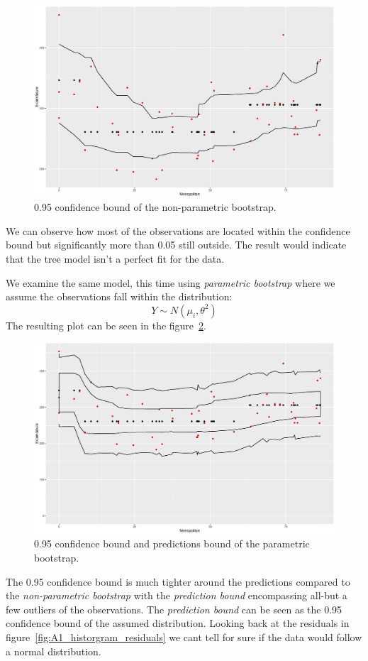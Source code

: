 \documentclass[a4paper,12pt]{article}
\begin{document}
    \begin{figure}[H]
    \centering
    \includegraphics[width=\textwidth]{figures/A1_nonparametric}  
    \caption{0.95 confidence bound of the non-parametric bootstrap. \label{fig:A1_nonparametric}}
    \end{figure}
    We can observe how most of the observations are located within the confidence bound but significantly more than 0.05 still outside. The result would indicate that the tree model isn't a perfect fit for the data.

    We examine the same model, this time using \textit{parametric bootstrap} where we assume the observations fall within the distribution:
    \begin{equation}
    Y \sim  N(\mu_i,\theta^2)
    \end{equation}
    The resulting plot can be seen in the figure~\ref{fig:A1_parametric}. 

    \begin{figure}[H]
    \centering
    \includegraphics[width=\textwidth]{figures/A1_parametric}  
    \caption{0.95 confidence bound and predictions bound of the parametric bootstrap. \label{fig:A1_parametric}}
    \end{figure}
    The 0.95 confidence bound is much tighter around the predictions compared to the \textit{non-parametric bootstrap} with the \textit{prediction bound} encompassing all-but a few outliers of the observations. The \textit{prediction bound} can be seen as the 0.95 confidence bound of the assumed distribution. Looking back at the residuals in figure~\ref{fig:A1_historgram_residuals} we cant tell for sure if the data would follow a normal distribution.
\end{document}
